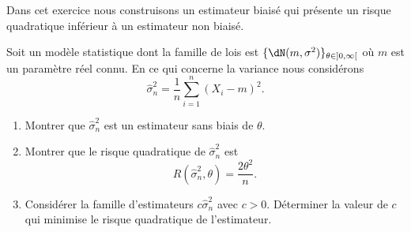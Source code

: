 \begin{example}
    Dans cet exercice nous construisons un estimateur biaisé qui présente un risque quadratique inférieur à un estimateur non biaisé.

    Soit un modèle statistique dont la famille de lois est \( \{ \dN(m,\sigma^2) \}_{\theta\in\mathopen] 0 , \infty \mathclose[}\) où \( m\) est un paramètre réel connu. En ce qui concerne la variance nous considérons
    \begin{equation}
        \hat\sigma_n^2=\frac{1}{ n }\sum_{i=1}^n(X_i-m)^2.
    \end{equation}
    \begin{enumerate}
        \item
            Montrer que \( \hat\sigma_n^2\) est un estimateur sans biais de \( \theta\).
        \item
            Montrer que le risque quadratique de \( \hat\sigma_n^2\) est
            \begin{equation}
                R(\hat\sigma_n^2,\theta)=\frac{ 2\theta^2 }{ n }.
            \end{equation}
        \item
            Considérer la famille d'estimateurs \( c\hat\sigma_n^2\) avec \( c>0\). Déterminer la valeur de \( c\) qui minimise le risque quadratique de l'estimateur.
    \end{enumerate}


\end{example}
